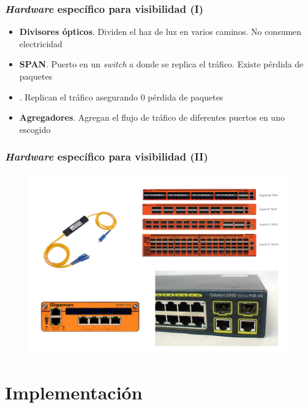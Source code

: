 \documentclass{beamer}
\begin{document}
\begin{frame}

\frametitle{\textit{Hardware} específico para visibilidad (I)}

\begin{itemize}
	\item \textbf{Divisores ópticos}. Dividen el haz de luz en varios caminos. No consumen electricidad
	\item \textbf{SPAN}. Puerto en un \textit{switch} a donde se replica el tráfico. Existe pérdida de paquetes
	\item \textbf{\color{purple}{TAP}}. Replican el tráfico asegurando 0 pérdida de paquetes
	\item \textbf{Agregadores}. Agregan el flujo de tráfico de diferentes puertos en uno escogido
\end{itemize}

\end{frame}

\begin{frame}
\frametitle{\textit{Hardware} específico para visibilidad (II)}

\begin{figure}[H]
	\centering
	\includegraphics[scale=0.7]{hardware.png}
	\label{hardware}
\end{figure}

\end{frame}

\section{Implementación}

\end{document}
